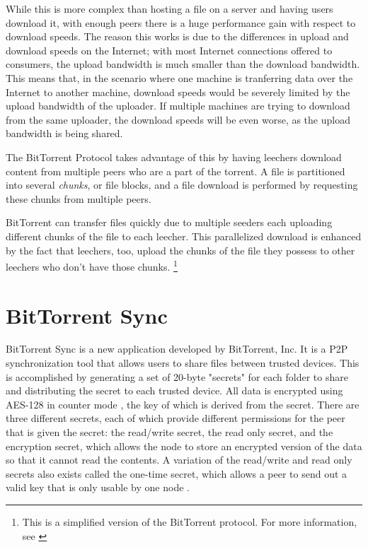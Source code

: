 \documentclass[12pt]{report}
\begin{document}
While this is more complex than hosting a file on a server and having users download it, with enough peers there is a huge performance gain with respect to download speeds. The reason this works is due to the differences in upload and download speeds on the Internet; with most Internet connections offered to consumers, the upload bandwidth is much smaller than the download bandwidth. This means that, in the scenario where one machine is tranferring data over the Internet to another machine, download speeds would be severely limited by the upload bandwidth of the uploader. If multiple machines are trying to download from the same uploader, the download speeds will be even worse, as the upload bandwidth is being shared.

The BitTorrent Protocol takes advantage of this by having leechers download content from multiple peers who are a part of the torrent. A file is partitioned into several \textit{chunks}, or file blocks, and a file download is performed by requesting these chunks from multiple peers. %

BitTorrent can transfer files quickly due to multiple seeders each uploading different chunks of the file to each leecher. This parallelized download is enhanced by the fact that leechers, too, upload the chunks of the file they possess to other leechers who don't have those chunks. \footnote {This is a simplified version of the BitTorrent protocol. For more information, see \cite{bittorrentProtocol}}

\section{BitTorrent Sync}
BitTorrent Sync is a new application developed by BitTorrent, Inc. It is a P2P synchronization tool that allows users to share files between trusted devices. This is accomplished by generating a set of 20-byte "secrets" for each folder to share and distributing the secret to each trusted device. All data is encrypted using AES-128 in counter mode \cite{btsynctech}, the key of which is derived from the secret. There are three different secrets, each of which provide different permissions for the peer that is given the secret: the read/write secret, the read only secret, and the encryption secret, which allows the node to store an encrypted version of the data so that it cannot read the contents. A variation of the read/write and read only secrets also exists called the one-time secret, which allows a peer to send out a valid key that is only usable by one node \cite{btsyncuserguide}.
\end{document}
